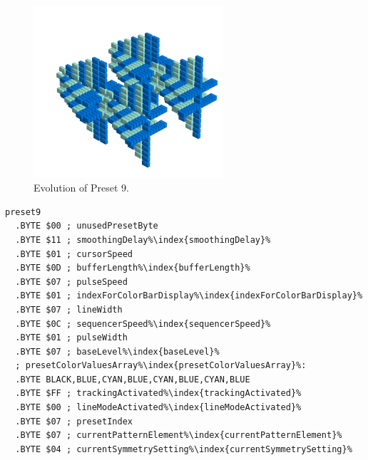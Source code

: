\clearpage
\rhead[]{\leftmark}
\begin{minipage}[b]{0.48\linewidth}
\begin{figure}[H]                                                          
  \centering                                                             
  \begin{adjustbox}{width=7cm,center}                                   
  \includegraphics[width=7cm]{src/presets/pattern9-45.png}%
  \end{adjustbox}                                                        
\caption{Evolution of Preset 9.}                                           
\end{figure}                                                               
\end{minipage}
\hspace{0.1cm}
\begin{minipage}[b]{0.48\linewidth}                                       
\begin{lstlisting}[basicstyle=\ttfamily\scriptsize,caption=Data structure for Preset 9.,escapechar=\%]
preset9
  .BYTE $00 ; unusedPresetByte
  .BYTE $11 ; smoothingDelay%\index{smoothingDelay}%
  .BYTE $01 ; cursorSpeed
  .BYTE $0D ; bufferLength%\index{bufferLength}%
  .BYTE $07 ; pulseSpeed
  .BYTE $01 ; indexForColorBarDisplay%\index{indexForColorBarDisplay}%
  .BYTE $07 ; lineWidth
  .BYTE $0C ; sequencerSpeed%\index{sequencerSpeed}%
  .BYTE $01 ; pulseWidth
  .BYTE $07 ; baseLevel%\index{baseLevel}%
  ; presetColorValuesArray%\index{presetColorValuesArray}%: 
  .BYTE BLACK,BLUE,CYAN,BLUE,CYAN,BLUE,CYAN,BLUE
  .BYTE $FF ; trackingActivated%\index{trackingActivated}%
  .BYTE $00 ; lineModeActivated%\index{lineModeActivated}%
  .BYTE $07 ; presetIndex
  .BYTE $07 ; currentPatternElement%\index{currentPatternElement}%
  .BYTE $04 ; currentSymmetrySetting%\index{currentSymmetrySetting}%
\end{lstlisting}
\end{minipage}

